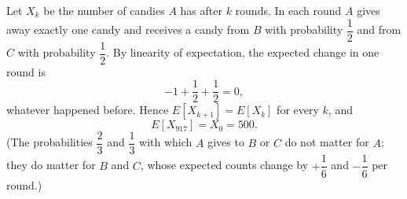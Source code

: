 Let $X_k$ be the number of candies $A$ has after $k$ rounds. In each round $A$ gives away exactly one candy and receives a candy from $B$ with probability $\dfrac12$ and from $C$ with probability $\dfrac12$. By linearity of expectation, the expected change in one round is
\[-1+\dfrac12+\dfrac12=0,\]
whatever happened before. Hence $E[X_{k+1}]=E[X_k]$ for every $k$, and
\[E[X_{917}]=X_0=\boxed{500}.\]
(The probabilities $\dfrac23$ and $\dfrac13$ with which $A$ gives to $B$ or $C$ do not matter for $A$; they do matter for $B$ and $C$, whose expected counts change by $+\dfrac16$ and $-\dfrac16$ per round.)
